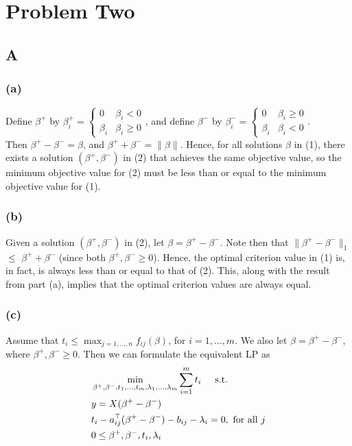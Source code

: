 

\section{Problem Two}

\subsection{A}

\subsubsection{(a)}
Define $\beta^+$ by $\beta_i^+ = \begin{cases} 0 & \beta_i < 0 \\ \beta_i &
\beta_i \geq 0 \end{cases}$, and define $\beta^-$ by $\beta_i^- = \begin{cases} 0 &
\beta_i \geq 0 \\ \beta_i & \beta_i < 0 \end{cases}$.\\
Then $\beta^+ - \beta^- = \beta$, and $\beta^+ + \beta^- = \| \beta \|$. Hence,
for all solutions $\beta$ in (1), there exists a solution $(\beta^+, \beta^-)$
    in (2) that achieves the same objective value, so the minimum objective
    value for (2) must be less than or equal to the minimum objective value for
    (1).

\subsubsection{(b)}
Given a solution $(\beta^+, \beta^-)$ in (2), let $\beta = \beta^+ - \beta^-$.
Note then that $\|\beta^+ - \beta^-\|_1$ $\leq$ $\beta^+ + \beta^-$ (since both
$\beta^+, \beta^- \geq 0$). Hence, the optimal criterion value in (1) is, in
fact, is always less than or equal to that of (2). This, along with the result
from part (a), implies that the optimal criterion values are always equal.

\subsubsection{(c)}
Assume that $t_i \leq \max_{j=1,\ldots,n} f_{ij}(\beta)$, for $i=1,\ldots,m$.
We also let $\beta = \beta^+ - \beta^-$, where $\beta^+,\beta^- \geq 0$. Then
we can formulate the equivalent LP as 
\begin{align}
    &\min_{\beta^+, \beta^-,t_1,\ldots,t_m, \lambda_1,\ldots,\lambda_m} \sum_{i=1}^m t_i \hspace{5mm} \text{s.t.}\\
    &y = X(\beta^+ - \beta^-)\\
    &t_i - a_{ij}^{\top}(\beta^+ - \beta^-) - b_{ij} - \lambda_i = 0, \text{ for all } j\\
    &0 \leq \beta^+,\beta^-,t_i,\lambda_i
\end{align}


